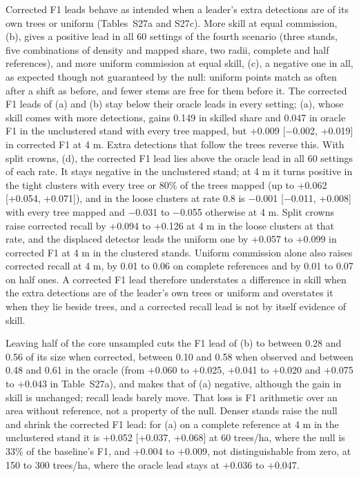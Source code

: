 \documentclass[10pt,a4paper]{article}
\begin{document}
Corrected F1 leads behave as intended when a leader's extra detections are of
its own trees or uniform (Tables~S27a and S27c). More skill at equal commission,
(b), gives a positive lead in all 60 settings of the fourth scenario (three
stands, five combinations of density and mapped share, two radii, complete and
half references), and more uniform commission at equal skill, (c), a negative
one in all, as expected though not guaranteed by the null: uniform points match
as often after a shift as before, and fewer stems are free for them before it.
The corrected F1 leads of (a) and (b) stay below their oracle leads in every
setting; (a), whose skill comes with more detections, gains 0.149 in skilled
share and 0.047 in oracle F1 in the unclustered stand with every tree mapped,
but +0.009 [$-$0.002, +0.019] in corrected F1 at 4 m. Extra detections that follow
the trees reverse this. With split crowns, (d), the corrected F1 lead lies above
the oracle lead in all 60 settings of each rate. It stays negative in the
unclustered stand; at 4 m it turns positive in the tight clusters with every
tree or 80\% of the trees mapped (up to +0.062 [+0.054, +0.071]), and in the
loose clusters at rate 0.8 is $-$0.001 [$-$0.011, +0.008] with every tree mapped and
$-$0.031 to $-$0.055 otherwise at 4 m. Split crowns raise corrected recall by +0.094
to +0.126 at 4 m in the loose clusters at that rate, and the displaced detector
leads the uniform one by +0.057 to +0.099 in corrected F1 at 4 m in the
clustered stands. Uniform commission alone also raises corrected recall at 4 m,
by 0.01 to 0.06 on complete references and by 0.01 to 0.07 on half ones. A
corrected F1 lead therefore understates a difference in skill when the extra
detections are of the leader's own trees or uniform and overstates it when they
lie beside trees, and a corrected recall lead is not by itself evidence of
skill.

Leaving half of the core unsampled cuts the F1 lead of (b) to between 0.28 and
0.56 of its size when corrected, between 0.10 and 0.58 when observed and
between 0.48 and 0.61 in the oracle (from +0.060 to +0.025, +0.041 to +0.020
and +0.075 to +0.043 in Table~S27a), and makes that of (a) negative, although
the gain in skill is unchanged; recall leads barely move. That loss is F1
arithmetic over an area without reference, not a property of the null. Denser
stands raise the null and shrink the corrected F1 lead: for (a) on a complete
reference at 4 m in the unclustered stand it is +0.052 [+0.037, +0.068] at 60
trees/ha, where the null is 33\% of the baseline's F1, and +0.004 to +0.009, not
distinguishable from zero, at 150 to 300 trees/ha, where the oracle lead stays
at +0.036 to +0.047.
\end{document}
